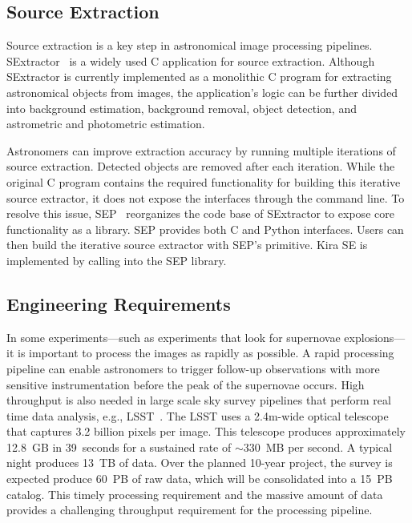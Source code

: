 \documentclass[10pt,journal,compsoc]{IEEEtran}
\begin{document}
\subsection{Source Extraction}
\label{sec:Background-SE}
Source extraction is a key step in astronomical image processing pipelines.
SExtractor~\cite{bertin96} is a widely used C application for source extraction.
Although SExtractor is currently implemented as a monolithic C program for extracting astronomical
objects from images, the application's logic can be further divided into 
background estimation, background removal, object detection, and astrometric 
and photometric estimation.

Astronomers can improve extraction accuracy by running multiple iterations of source
extraction. Detected objects are removed after each iteration. While
the original C program contains the required functionality for building this iterative source extractor,
it does not expose the interfaces through the command line. To resolve this issue,
SEP~\cite{barbary2015} reorganizes the code base of SExtractor to expose core
functionality as a library. SEP provides both C and Python interfaces. Users can then
build the iterative source extractor with SEP's primitive. Kira SE is implemented by calling into
the SEP library.

\subsection{Engineering Requirements}
\label{sec:Background-EngReq}

In some experiments---such as experiments that look for supernovae explosions---it is important to process
the images as rapidly as possible. A rapid processing pipeline can enable astronomers to trigger follow-up
observations with more sensitive instrumentation before the peak of the supernovae occurs.
High throughput is also needed in large scale
sky survey pipelines that perform real time data analysis, e.g., LSST~\cite{ivezic08}.
The LSST uses a 2.4m-wide optical telescope that captures 3.2 billion pixels per
image. This telescope produces approximately 12.8~GB in 39~seconds
for a sustained rate of $\sim$330~MB per second. A typical night produces 13~TB of data. 
Over the planned 10-year project, the survey is expected produce 60~PB of raw data, which will be consolidated into a 15~PB catalog.
This timely processing requirement and the massive amount of data provides a challenging throughput requirement for the 
processing pipeline. 
\end{document}
